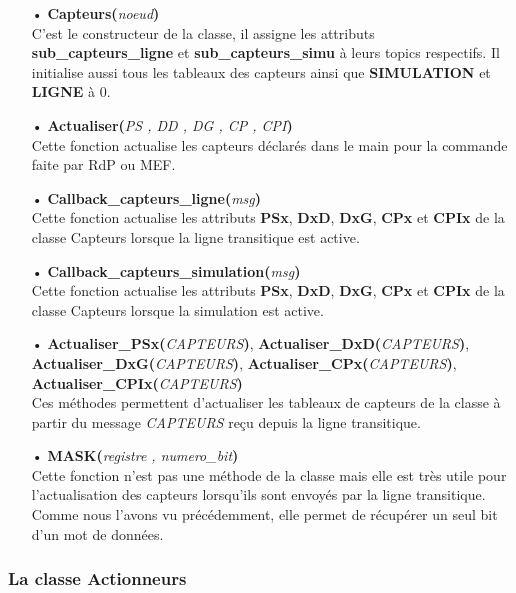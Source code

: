 \documentclass[a4paper,french, titlepage]{book}
\begin{document}
\begin{itemize}
\item[•] \textbf{Capteurs(}\emph{noeud}\textbf{)}\\
C'est le constructeur de la classe, il assigne les attributs \textbf{sub\_capteurs\_ligne} et \textbf{sub\_capteurs\_simu} à leurs topics respectifs. Il initialise aussi tous les tableaux des capteurs ainsi que \textbf{SIMULATION} et \textbf{LIGNE} à 0.
\item[ ] 
\item[•] \textbf{Actualiser(}\emph{PS , DD , DG , CP , CPI}\textbf{)}\\
Cette fonction actualise les capteurs déclarés dans le main pour la commande faite par RdP ou MEF.
\item[ ] 
\item[•] \textbf{Callback\_capteurs\_ligne(}\emph{msg}\textbf{)}\\
Cette fonction actualise les attributs \textbf{PSx}, \textbf{DxD}, \textbf{DxG}, \textbf{CPx} et \textbf{CPIx} de la classe Capteurs lorsque la ligne transitique est active.
\item[ ] 
\item[•] \textbf{Callback\_capteurs\_simulation(}\emph{msg}\textbf{)}\\
Cette fonction actualise les attributs \textbf{PSx}, \textbf{DxD}, \textbf{DxG}, \textbf{CPx} et \textbf{CPIx} de la classe Capteurs lorsque la simulation est active.
\item[ ] 
\item[•] \textbf{Actualiser\_PSx(}\emph{CAPTEURS}\textbf{)}, \textbf{Actualiser\_DxD(}\emph{CAPTEURS}\textbf{)}, \textbf{Actualiser\_DxG(}\emph{CAPTEURS}\textbf{)}, \textbf{Actualiser\_CPx(}\emph{CAPTEURS}\textbf{)}, \textbf{Actualiser\_CPIx(}\emph{CAPTEURS}\textbf{)}\\
Ces méthodes permettent d'actualiser les tableaux de capteurs de la classe à partir du message \emph{CAPTEURS} reçu depuis la ligne transitique.
\item[ ] 
\item[•] \textbf{MASK(}\emph{registre , numero\_bit}\textbf{)}\\
Cette fonction n'est pas une méthode de la classe mais elle est très utile pour l'actualisation des capteurs lorsqu'ils sont envoyés par la ligne transitique. Comme nous l'avons vu précédemment, elle permet de récupérer un seul bit d'un mot de données.
\end{itemize}

\subsubsection{La classe Actionneurs}
\end{document}
